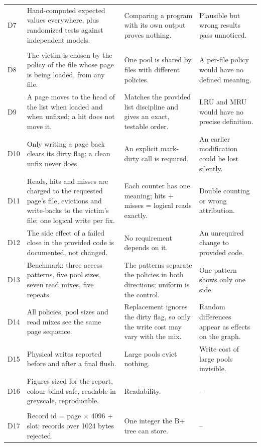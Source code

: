 \documentclass[11pt,a4paper]{article}
\begin{document}
\begin{longtable}{>{\raggedright\arraybackslash}p{0.7cm}>{\raggedright\arraybackslash}p{5.2cm}>{\raggedright\arraybackslash}p{4.4cm}>{\raggedright\arraybackslash}p{4.3cm}}
D7 & Hand-computed expected values everywhere, plus randomized tests against independent models. & Comparing a program with its own output proves nothing. & Plausible but wrong results pass unnoticed. \\
\multicolumn{4}{l}{\textit{Part 1: buffer manager}} \\
D8 & The victim is chosen by the policy of the file whose page is being loaded, from any file. & One pool is shared by files with different policies. & A per-file policy would have no defined meaning. \\
D9 & A page moves to the head of the list when loaded and when unfixed; a hit does not move it. & Matches the provided list discipline and gives an exact, testable order. & LRU and MRU would have no precise definition. \\
D10 & Only writing a page back clears its dirty flag; a clean unfix never does. & An explicit mark-dirty call is required. & An earlier modification could be lost silently. \\
D11 & Reads, hits and misses are charged to the requested page's file, evictions and write-backs to the victim's file; one logical write per fix. & Each counter has one meaning; hits + misses = logical reads exactly. & Double counting or wrong attribution. \\
D12 & The side effect of a failed close in the provided code is documented, not changed. & No requirement depends on it. & An unrequired change to provided code. \\
D13 & Benchmark: three access patterns, five pool sizes, seven read mixes, five repeats. & The patterns separate the policies in both directions; uniform is the control. & One pattern shows only one side. \\
D14 & All policies, pool sizes and read mixes see the same page sequence. & Replacement ignores the dirty flag, so only the write cost may vary with the mix. & Random differences appear as effects on the graph. \\
D15 & Physical writes reported before and after a final flush. & Large pools evict nothing. & Write cost of large pools invisible. \\
D16 & Figures sized for the report, colour-blind-safe, readable in greyscale, reproducible. & Readability. & -- \\
\multicolumn{4}{l}{\textit{Part 2: slotted pages and static management}} \\
D17 & Record id = page \(\times\) 4096 + slot; records over 1024 bytes rejected. & One integer the B+ tree can store. & -- \\

\end{longtable}
\end{document}

